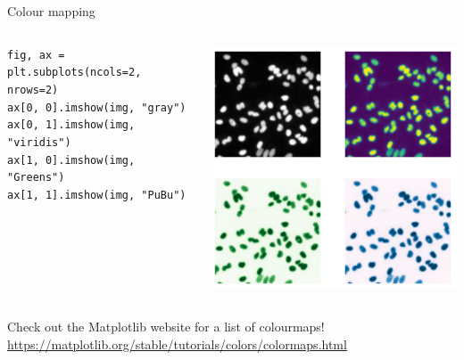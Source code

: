 \documentclass[9pt, aspectratio=169]{beamer}
\begin{document}
\begin{frame}
    {Colour mapping}
    \begin{columns}
        \begin{column}{0.6\textwidth}
            \begin{codebox}
                \texttt{fig, ax = plt.subplots(ncols=2, nrows=2)\\
                    ax[0, 0].imshow(img, "gray")\\
                    ax[0, 1].imshow(img, "viridis")\\
                    ax[1, 0].imshow(img, "Greens")\\
                    ax[1, 1].imshow(img, "PuBu")}
            \end{codebox}
        \end{column}
        \begin{column}{0.4\textwidth}
            \includegraphics[width=\textwidth]{nuclei_cmapped.png}
        \end{column}
    \end{columns}
    \centering

    Check out the Matplotlib website for a list of colourmaps! \url{https://matplotlib.org/stable/tutorials/colors/colormaps.html}

\end{frame}
\end{document}
